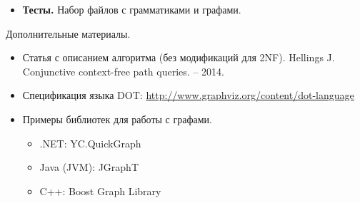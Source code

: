 \documentclass[12pt]{article}
\begin{document}
{\begin{itemize}
\begin{itemize}
            \item Тройки $(N_i,v_1,v_2)$, такие что во входном графе существует путь из $v_1$ в $v_2$, выводимый из $N_i$. Формат вывода: каждая тройка на новой строке, в круглых скобках, элементы разделены запятыми. Вокруг скобок пробелы не ставятся, справа от запятой 1 пробел. Вывод отсортирован в лексикографическом порядке. Пример:
            \begin{verbatim}
            (A, 1, 2)
            (A, 2, 4)
            (B, 3, 4)
            \end{verbatim}
        \end{itemize}
        \item \textbf{Тесты.} Набор файлов с грамматиками и графами.
    \end{itemize}
  
}
Дополнительные материалы.
\begin{itemize}
    \item Статья с описанием алгоритма (без модификаций для 2NF). Hellings J. Conjunctive context-free path queries. – 2014.
    \item Спецификация языка DOT: \url{http://www.graphviz.org/content/dot-language}
    \item Примеры библиотек для работы с графами. 
    \begin{itemize}
        \item .NET: YC.QuickGraph
        \item Java (JVM): JGraphT
        \item C++: Boost Graph Library
    \end{itemize}
\end{itemize}
\end{document}
